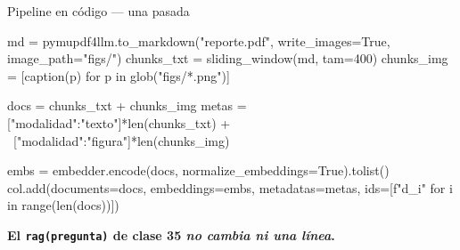 \documentclass[aspectratio=169, 11pt]{beamer}
\begin{document}
\begin{frame}{Pipeline en código --- una pasada}
  \begin{pyblock}
md = pymupdf4llm.to_markdown("reporte.pdf",
                             write_images=True, image_path="figs/")
chunks_txt = sliding_window(md, tam=400)
chunks_img = [caption(p) for p in glob("figs/*.png")]

docs   = chunks_txt + chunks_img
metas  = [{"modalidad":"texto"}]*len(chunks_txt) + \
         [{"modalidad":"figura"}]*len(chunks_img)

embs = embedder.encode(docs, normalize_embeddings=True).tolist()
col.add(documents=docs, embeddings=embs, metadatas=metas,
        ids=[f"d_{i}" for i in range(len(docs))])
  \end{pyblock}
  \vspace{4pt}
  \begin{tcolorbox}[colback=arcaRed!8, colframe=arcaRed, leftrule=3pt,
    boxrule=0pt, sharp corners, left=8pt, right=8pt, top=3pt, bottom=3pt]
    {\footnotesize\color{arcaDark}\bfseries
    El \texttt{rag(pregunta)} de clase 35 \emph{no cambia ni una línea}.}
  \end{tcolorbox}
\end{frame}
\end{document}
